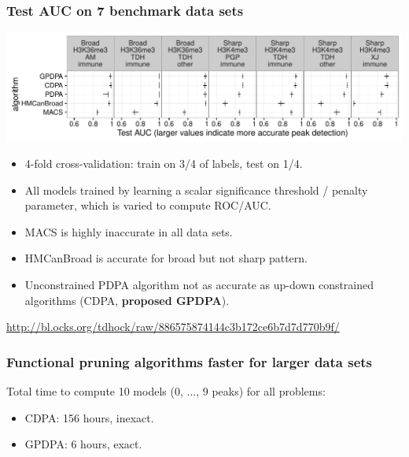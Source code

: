 \documentclass{beamer}
\begin{document}

 
\begin{frame}
  \frametitle{Test AUC on 7 benchmark data sets}
  \includegraphics[width=\textwidth]{figure-test-error-dots}
  \begin{itemize}
  \item 4-fold cross-validation: train on 3/4 of labels, test on 1/4.
  \item All models trained by learning a scalar significance
    threshold / penalty parameter, which is varied to compute ROC/AUC.
  \item MACS is highly inaccurate in all data sets.
  \item HMCanBroad is accurate for broad but not sharp pattern.
  \item Unconstrained PDPA algorithm not as accurate as up-down
    constrained algorithms (CDPA, \textbf{proposed GPDPA}).
  \end{itemize}
  \scriptsize
\url{http://bl.ocks.org/tdhock/raw/886575874144c3b172ce6b7d7d770b9f/}
\end{frame}

\begin{frame}
  \frametitle{Functional pruning algorithms faster for larger data sets}
  

  Total time to compute 10 models (0, ..., 9 peaks) for all problems:
  \begin{itemize}
  \item CDPA: 156 hours, inexact.
  \item GPDPA: 6 hours, exact.
  \end{itemize}
\end{frame}
\end{document}
